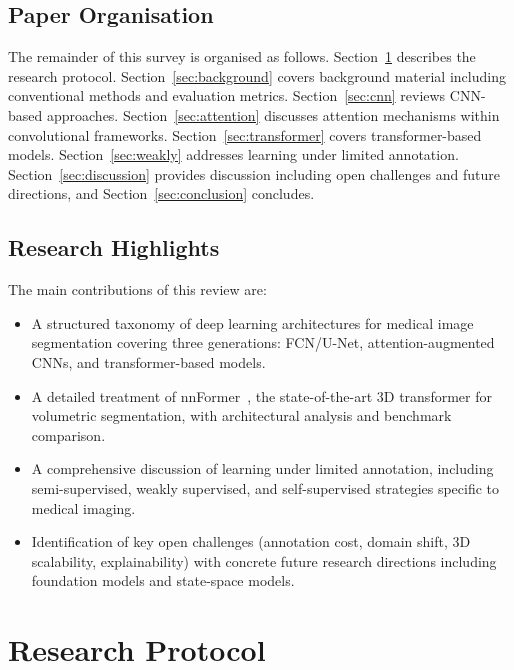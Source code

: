 \documentclass[preprint,12pt,authoryear]{elsarticle}
\begin{document}
\subsection{Paper Organisation}
\label{sec:org}

The remainder of this survey is organised as follows. Section~\ref{sec:protocol}
describes the research protocol. Section~\ref{sec:background} covers background
material including conventional methods and evaluation metrics.
Section~\ref{sec:cnn} reviews CNN-based approaches. Section~\ref{sec:attention}
discusses attention mechanisms within convolutional frameworks.
Section~\ref{sec:transformer} covers transformer-based models.
Section~\ref{sec:weakly} addresses learning under limited annotation.
Section~\ref{sec:discussion} provides discussion including open challenges and
future directions, and Section~\ref{sec:conclusion} concludes.

\subsection{Research Highlights}
\label{sec:highlights}

The main contributions of this review are:
\begin{itemize}[leftmargin=*, itemsep=2pt]
  \item A structured taxonomy of deep learning architectures for medical image
        segmentation covering three generations: FCN/U-Net, attention-augmented
        CNNs, and transformer-based models.
  \item A detailed treatment of nnFormer~\citep{zhou2023nnformer}, the
        state-of-the-art 3D transformer for volumetric segmentation, with
        architectural analysis and benchmark comparison.
  \item A comprehensive discussion of learning under limited annotation,
        including semi-supervised, weakly supervised, and self-supervised
        strategies specific to medical imaging.
  \item Identification of key open challenges (annotation cost, domain shift,
        3D scalability, explainability) with concrete future research directions
        including foundation models and state-space models.
\end{itemize}

\section{Research Protocol}
\label{sec:protocol}
\end{document}
